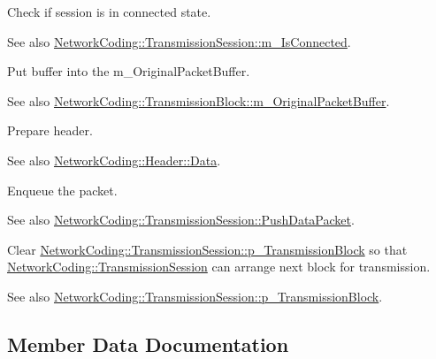 \begin{DoxyEnumerate}
\item Check if session is in connected state. \begin{DoxySeeAlso}{See also}
\hyperlink{class_network_coding_1_1_transmission_session_aa12eab14f68b6e4dc5e2de25ff017282}{Network\+Coding\+::\+Transmission\+Session\+::m\+\_\+\+Is\+Connected}.
\end{DoxySeeAlso}

\item Put buffer into the m\+\_\+\+Original\+Packet\+Buffer. \begin{DoxySeeAlso}{See also}
\hyperlink{class_network_coding_1_1_transmission_block_aeefe661df0123d02bb1fc463136d2fe5}{Network\+Coding\+::\+Transmission\+Block\+::m\+\_\+\+Original\+Packet\+Buffer}.
\end{DoxySeeAlso}

\item Prepare header. \begin{DoxySeeAlso}{See also}
\hyperlink{struct_network_coding_1_1_header_1_1_data}{Network\+Coding\+::\+Header\+::\+Data}.
\end{DoxySeeAlso}

\item Enqueue the packet. \begin{DoxySeeAlso}{See also}
\hyperlink{class_network_coding_1_1_transmission_session_ae248b2c48a54243ce1e47837337231df}{Network\+Coding\+::\+Transmission\+Session\+::\+Push\+Data\+Packet}.
\end{DoxySeeAlso}

\item Clear \hyperlink{class_network_coding_1_1_transmission_session_acc18d6b10a856b3dfda76c7b85899911}{Network\+Coding\+::\+Transmission\+Session\+::p\+\_\+\+Transmission\+Block} so that \hyperlink{class_network_coding_1_1_transmission_session}{Network\+Coding\+::\+Transmission\+Session} can arrange next block for transmission. \begin{DoxySeeAlso}{See also}
\hyperlink{class_network_coding_1_1_transmission_session_acc18d6b10a856b3dfda76c7b85899911}{Network\+Coding\+::\+Transmission\+Session\+::p\+\_\+\+Transmission\+Block}.
\end{DoxySeeAlso}

\end{DoxyEnumerate}

\subsection{Member Data Documentation}
